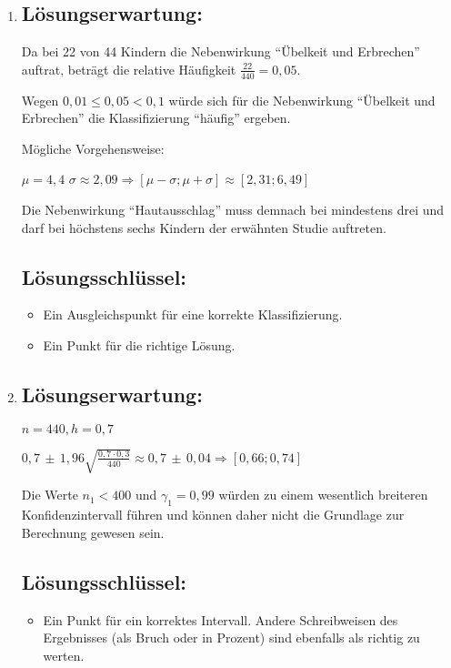 \begin{langesbeispiel}
{\begin{enumerate}
	\item \subsection{Lösungserwartung:}
	
	Da bei 22 von 44 Kindern die Nebenwirkung "`Übelkeit und Erbrechen"' auftrat, beträgt die relative Häufigkeit $\frac{22}{440}=0,05$.
	
	Wegen $0,01\leq 0,05<0,1$ würde sich für die Nebenwirkung "`Übelkeit und Erbrechen"' die Klassifizierung "`häufig"' ergeben.\leer
	
	Mögliche Vorgehensweise:
	
	$\mu=4,4$ $\sigma\approx 2,09 \Rightarrow [\mu-\sigma;\mu+\sigma]\approx [2,31;6,49]$
	
	Die Nebenwirkung "`Hautausschlag"' muss demnach bei mindestens drei und darf bei höchstens sechs Kindern der erwähnten Studie auftreten.
	
	\subsection{Lösungsschlüssel:}
	
\begin{itemize}
	\item Ein Ausgleichspunkt für eine korrekte Klassifizierung.   
	\item Ein Punkt für die richtige Lösung. 
\end{itemize}

\item \subsection{Lösungserwartung:}
	
	$n=440, h=0,7$
	
	$0,7\,\pm\,1,96\sqrt{\frac{0,7\cdot 0,3}{440}}\approx 0,7\,\pm\,0,04 \Rightarrow [0,66;0,74]$\leer
	
	Die Werte $n_1<400$ und $\gamma_1=0,99$ würden zu einem wesentlich breiteren Konfidenzintervall führen und können daher nicht die Grundlage zur Berechnung gewesen sein.	
	\subsection{Lösungsschlüssel:}
	
\begin{itemize}
	\item  Ein Punkt für ein korrektes Intervall. Andere Schreibweisen des Ergebnisses (als Bruch oder in Prozent) sind ebenfalls als richtig zu werten. 
	

\end{itemize}
\end{enumerate}}
\end{langesbeispiel}
